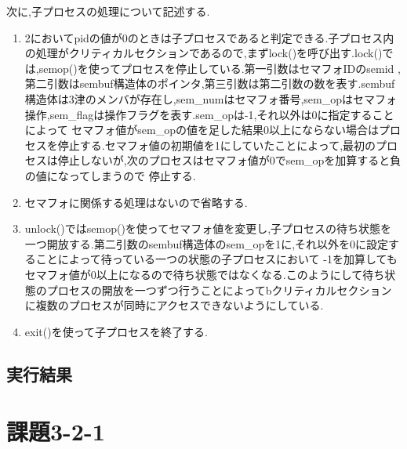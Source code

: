 \documentclass[dvipdfmx]{jarticle}
\begin{document}
次に,子プロセスの処理について記述する.
\begin{enumerate}
    \item 2においてpidの値が0のときは子プロセスであると判定できる.子プロセス内の処理がクリティカルセクションであるので,まずlock()を呼び出す.lock()では,semop()を使ってプロセスを停止している.第一引数はセマフォIDのsemid
    ,第二引数はsembuf構造体のポインタ,第三引数は第二引数の数を表す.sembuf構造体は3津のメンバが存在し,sem\_numはセマフォ番号,sem\_opはセマフォ操作,sem\_flagは操作フラグを表す.\cite{4}sem\_opは-1,それ以外は0に指定することによって
    セマフォ値がsem\_opの値を足した結果0以上にならない場合はプロセスを停止する.セマフォ値の初期値を1にしていたことによって,最初のプロセスは停止しないが,次のプロセスはセマフォ値が0でsem\_opを加算すると負の値になってしまうので
    停止する.
    \item セマフォに関係する処理はないので省略する.
    \item unlock()ではsemop()を使ってセマフォ値を変更し,子プロセスの待ち状態を一つ開放する.第二引数のsembuf構造体のsem\_opを1に,それ以外を0に設定することによって待っている一つの状態の子プロセスにおいて
    -1を加算してもセマフォ値が0以上になるので待ち状態ではなくなる.このようにして待ち状態のプロセスの開放を一つずつ行うことによってbクリティカルセクションに複数のプロセスが同時にアクセスできないようにしている.
    \item exit()を使って子プロセスを終了する.
\end{enumerate}
\subsection{実行結果}
\section{課題3-2-1}
\end{document}
